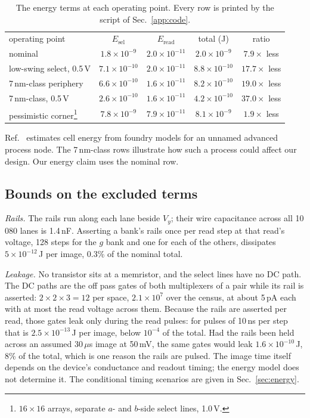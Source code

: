 \documentclass[reprint,amsmath,amssymb,aps,nofootinbib]{revtex4-2}
\begin{document}
\begin{table}
\caption{The energy terms at each operating point. Every row is
printed by the script of
Sec.~\ref{app:code}.\label{tab:app-results}}
\begin{ruledtabular}
\begin{tabular}{lcccc}
operating point & $E_{\mathrm{sel}}$ & $E_{\mathrm{read}}$ &
  total (J) & ratio \\
\colrule
nominal & $1.8\times10^{-9}$ & $2.0\times10^{-11}$ &
  $2.0\times10^{-9}$ & $7.9\times$ less \\
low-swing select, 0.5\,V & $7.1\times10^{-10}$ & $2.0\times10^{-11}$ &
  $8.8\times10^{-10}$ & $17.7\times$ less \\
7\,nm-class periphery & $6.6\times10^{-10}$ & $1.6\times10^{-11}$ &
  $8.2\times10^{-10}$ & $19.0\times$ less \\
7\,nm-class, 0.5\,V & $2.6\times10^{-10}$ & $1.6\times10^{-11}$ &
  $4.2\times10^{-10}$ & $37.0\times$ less \\
pessimistic corner\footnote{$16 \times 16$ arrays, separate $a$- and
  $b$-side select lines, 1.0\,V.} & $7.8\times10^{-9}$ &
  $7.9\times10^{-11}$ & $8.1\times10^{-9}$ & $1.9\times$ less \\
\end{tabular}
\end{ruledtabular}
\end{table}

Ref.~\cite{jelincic2025dtm} estimates cell energy from foundry models
for an unnamed advanced process node. The 7\,nm-class rows illustrate
how such a process could affect our design. Our energy claim uses the
nominal row.

\subsection{Bounds on the excluded terms}\label{app:excluded}

\emph{Rails.} The rails run along each lane beside $V_y$; their wire
capacitance across all 10\,080 lanes is 1.4\,nF. Asserting a bank's
rails once per read step at that read's voltage, 128 steps for the
$g$ bank and one for each of the others, dissipates $5 \times
10^{-12}$\,J per image, 0.3\% of the nominal total.

\emph{Leakage.} No transistor sits at a memristor, and the select lines
have no DC path. The DC paths are the off pass gates of both
multiplexers of a pair while its rail is asserted: $2 \times 2 \times
3 = 12$ per space, $2.1 \times 10^{7}$ over the census, at about 5\,pA
each with at most the read voltage across them. Because the rails are
asserted per read, those gates leak only during the read pulses: for
pulses of 10\,ns per step that is $2.5 \times 10^{-13}$\,J per image,
below $10^{-4}$ of the total. Had the rails been held across an assumed
30\,$\mu$s image at 50\,mV, the same gates would leak $1.6 \times
10^{-10}$\,J, 8\% of the total, which is one reason the rails are
pulsed. The image time itself depends on the device's conductance and
readout timing; the energy model does not determine it. The conditional
timing scenarios are given in Sec.~\ref{sec:energy}.
\end{document}
